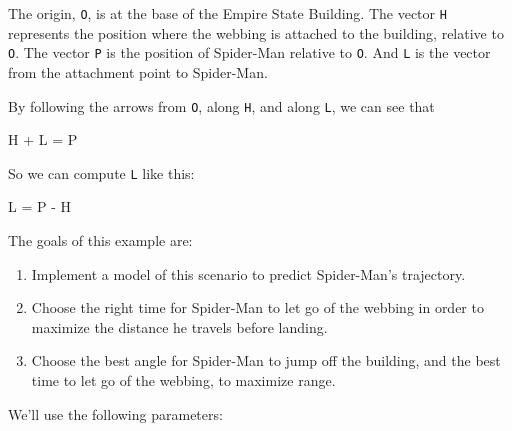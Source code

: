 The origin, \lstinline{O}, is at the base of the Empire State Building. The
vector \lstinline{H} represents the position where the webbing is attached
to the building, relative to \lstinline{O}. The vector \lstinline{P} is the
position of Spider-Man relative to \lstinline{O}. And \lstinline{L} is the
vector from the attachment point to Spider-Man.


By following the arrows from \lstinline{O}, along \lstinline{H}, and along
\lstinline{L}, we can see that

\begin{code}
H + L = P
\end{code}

So we can compute \lstinline{L} like this:

\begin{code}
L = P - H
\end{code}

The goals of this example are:

\begin{enumerate}

\item
  Implement a model of this scenario to predict Spider-Man's trajectory.


\item
  Choose the right time for Spider-Man to let go of the webbing in order to maximize the distance he travels before landing.


\item
  Choose the best angle for Spider-Man to jump off the building, and the best time to let go of the webbing, to maximize range.

  
\end{enumerate}

We'll use the following parameters:


